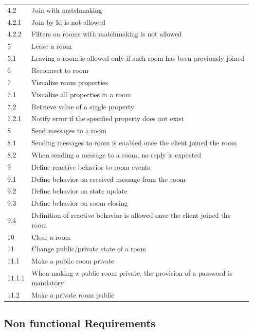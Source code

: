 \begin{center}
\begin{longtable}{|l|l|}
4.2     & Join with matchmaking \\
4.2.1   & Join by Id is not allowed \\
4.2.2   & Filters on rooms with matchmaking is not allowed \\
5       & Leave a room \\
5.1     & Leaving a room is allowed only if such room has been previously joined \\
6       & Reconnect to room \\
7       & Visualize room properties \\
7.1     & Visualize all properties in a room \\
7.2     & Retrieve value of a single property \\
7.2.1   & Notify error if the specified property does not exist \\
8       & Send messages to a room \\
8.1     & Sending messages to room is enabled once the client joined the room \\
8.2     & When sending a message to a room, no reply is expected \\
9       & Define reactive behavior to room events \\
9.1     & Define behavior on received message from the room \\
9.2     & Define behavior on state update \\
9.3     & Define behavior on room closing \\
9.4     & Definition of reactive behavior is allowed once the client joined the room \\
10      & Close a room \\
11      & Change public/private state of a room \\
11.1    & Make a public room private \\
11.1.1  & When making a public room private, the provision of a password is mandatory \\ 
11.2    & Make a private room public \\
\hline

  \end{longtable}
\end{center}

\newpage

\subsection{Non functional Requirements} 

